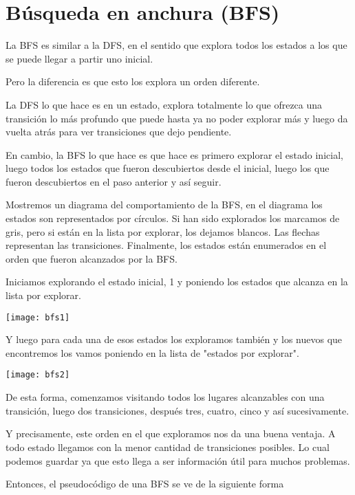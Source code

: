 \chapter{Búsqueda en anchura (BFS)}
La BFS es similar a la DFS, en el sentido que explora todos los estados a los que se puede llegar a partir uno inicial.

Pero la diferencia es que esto los explora un orden diferente.

La DFS lo que hace es en un estado, explora totalmente lo que ofrezca una transición lo más profundo que puede hasta ya no poder explorar más y luego  da vuelta atrás para ver transiciones que dejo pendiente.

En cambio, la BFS lo que hace es que hace es primero explorar el estado inicial, luego todos los estados que fueron descubiertos desde el inicial, luego los que fueron descubiertos en el paso anterior y así seguir.

Mostremos un diagrama del comportamiento de la BFS, en el diagrama los estados son representados por círculos. Si han sido explorados los marcamos de gris, pero si están en la lista por explorar, los dejamos blancos. Las flechas representan las transiciones. Finalmente, los estados están enumerados en el orden que fueron alcanzados por la BFS.

Iniciamos explorando el estado inicial, 1 y poniendo los estados que alcanza en la lista por explorar.

\begin{center}
	\texttt{[image: bfs1]}
\end{center}

Y luego para cada una de esos estados los exploramos también y los nuevos que encontremos los vamos poniendo en la lista de "estados por explorar". 

\begin{center}
	\texttt{[image: bfs2]}
\end{center}

De esta forma, comenzamos visitando todos los lugares alcanzables con una transición, luego dos transiciones, después tres, cuatro, cinco y  así sucesivamente.

Y precisamente, este orden en el que exploramos nos da una buena ventaja. A todo estado llegamos con la menor cantidad de transiciones posibles. Lo cual podemos guardar ya que esto llega a ser información útil para muchos problemas.

Entonces, el pseudocódigo de una BFS se ve de la siguiente forma

